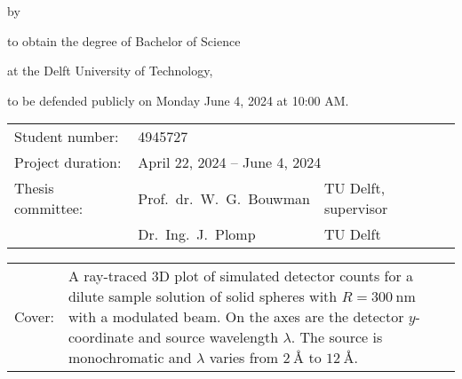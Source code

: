 \begin{titlepage}
	
	\begin{center}
		
		{\makeatletter
			\largetitlestyle\fontsize{45}{45}\selectfont\@title
			\makeatother}
		
		{\makeatletter
			\ifdefvoid{\@subtitle}{}{\bigskip\titlestyle\fontsize{20}{20}\selectfont\@subtitle}
			\makeatother}
		
		\bigskip
		\bigskip
		
		by
		
		\bigskip
		\bigskip
		
		{\makeatletter
			\largetitlestyle\fontsize{25}{25}\selectfont\@author
			\makeatother}
		
		\bigskip
		\bigskip
		
		to obtain the degree of Bachelor of Science
		
		at the Delft University of Technology,
		
		to be defended publicly on Monday June 4, 2024 at 10:00 AM.
		
		\vfill
		
		\begin{tabular}{lll}
			Student number: & 4945727 \\
			Project duration: & \multicolumn{2}{l}{April 22, 2024 -- June 4, 2024} \\
			Thesis committee: & Prof.\ dr.\ W.\ G.\ Bouwman & TU Delft, supervisor \\
			& Dr.\ Ing.\ J.\ Plomp & TU Delft
		\end{tabular}
		
		\bigskip
		\bigskip
		
		\bigskip
		\bigskip
		\begin{tabular}{p{15mm}p{10cm}}
			Cover: & A ray-traced 3D plot of simulated detector counts for a dilute sample solution of solid spheres with $R = \SI{300}{\nano\meter}$ with a modulated beam. On the axes are the detector $y$-coordinate and source wavelength $\lambda$. The source is monochromatic and $\lambda$ varies from $\SI{2}{\angstrom}$ to $\SI{12}{\angstrom}$.\\
		\end{tabular}
		

\end{center}
\end{titlepage}
